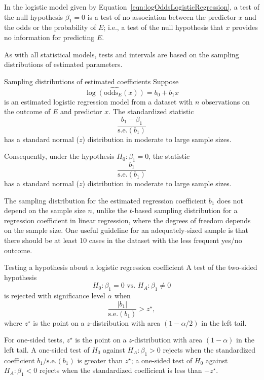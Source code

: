 In the logistic model given by Equation~\ref{eqn:logOddsLogisticRegression}, a test of the null hypothesis $\beta_1 = 0$ is a test of no association between the predictor $x$ and the odds or the probability of $E$; i.e., a test of the null hypothesis that $x$ provides no information for predicting $E$.

As with all statistical models, tests and intervals are based on the sampling distributions of estimated parameters.

\begin{onebox}{Sampling distributions of estimated coefficients}
Suppose
\[
  \widehat{\log(\textrm{odds}_{E}(x))} = b_0 + b_1 x
\]
is an estimated logistic regression model from a dataset with $n$ observations on the outcome of $E$ and predictor $x$.  The standardized statistic
\[
      \frac{b_1 - \beta_1}{\textrm{s.e.}(b_1)}
\]
has a standard normal ($z$) distribution in moderate to large sample sizes.

Consequently, under the hypothesis $H_0: \beta_1 = 0$, the statistic
\[
      \frac{b_1}{\textrm{s.e.}(b_1)}
\]
has a standard normal ($z$) distribution in moderate to large sample sizes.
\end{onebox}

The sampling distribution for the estimated regression coefficient $b_1$ does not depend on the sample size $n$, unlike the $t$-based sampling distribution for a regression coefficient in linear regression, where the degrees of freedom depends on the sample size.  One useful guideline for an adequately-sized sample is that there should be at least 10 cases in the dataset with the less frequent yes/no outcome.

\begin{onebox}{Testing a hypothesis about a logistic regression coefficient}
A test of the two-sided hypothesis
\[
  H_0: \beta_1 = 0 \text{ vs. } H_A: \beta_1 \ne 0
\]
is rejected with significance level $\alpha$ when
\[
     \frac{|b_1|}{\textrm{s.e.}(b_1)} > z^\star,
\]
where $z^\star$ is the point on a $z$-distribution with area $(1 - \alpha/2)$ in the left tail.
\end{onebox}

For one-sided tests, $z^\star$ is the point on a $z$-distribution with area $(1 - \alpha)$ in the left tail. A one-sided test of $H_0$ against $H_A: \beta_1 > 0$ rejects when the standardized coefficient $b_1/\textrm{s.e.}(b_1)$ is greater than  $ z^\star$; a one-sided test of $H_0$ against $H_A: \beta_1 < 0$  rejects when the standardized coefficient is less than $-z^\star$.

